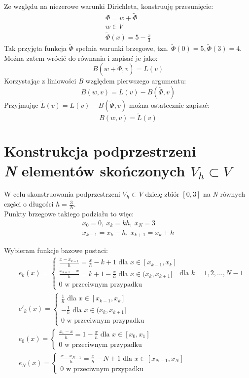 \documentclass{article}
\begin{document}
Ze względu na niezerowe warunki Dirichleta, konstruuję przesunięcie:
\begin{gather*}
    \Phi = w + \tilde{\Phi}\\
    w \in V\\
    \tilde{\Phi}(x) = 5 - \frac{x}{3}
\end{gather*}
Tak przyjęta funkcja \(\tilde{\Phi}\) spełnia warunki brzegowe, tzn. \(\tilde{\Phi}(0) = 5, \tilde{\Phi}(3) = 4\).\\
Można zatem wrócić do równania i zapisać je jako:
\[B(w + \tilde{\Phi}, v) = L(v)\]
Korzystając z liniowości \textit{B} względem pierwszego argumentu:
\[B(w, v) = L(v) - B(\tilde{\Phi}, v)\]
Przyjmując \(\tilde{L}(v) = L(v) - B(\tilde{\Phi}, v)\) można ostatecznie zapisać:
\[B(w, v) = \tilde{L}(v)\]

\section{Konstrukcja podprzestrzeni\\\textit{N} elementów skończonych \(V_h \subset V\)}

W celu skonstruowania podprzestrzeni \(V_h \subset V\) dzielę zbiór \([0, 3]\) na \textit{N} równych części o długości \(h = \frac{3}{N}\).\\
Punkty brzegowe takiego podziału to więc:
\begin{gather*}
    x_0 = 0,\ x_k = kh,\ x_N = 3\\
    x_{k-1} = x_k - h,\ x_{k+1} = x_k + h
\end{gather*}

\noindent
Wybieram funkcje bazowe postaci:
\begin{align*}
    &e_k(x) =
    \begin{cases}
        \frac{x - x_{k-1}}{h} = \frac{x}{h} - k + 1 \text{ dla } x \in [x_{k-1}, x_k]\\
        \frac{x_{k+1} - x}{h} = k + 1 - \frac{x}{h} \text{ dla } x \in (x_k, x_{k+1}]\\
        0 \text{ w przeciwnym przypadku}
    \end{cases} \text{dla } k = 1, 2, \ldots, N-1\\
    &e'_k(x) =
    \begin{cases}
        \frac{1}{h} \text{ dla } x \in [x_{k-1}, x_k]\\
        -\frac{1}{h} \text{ dla } x \in (x_k, x_{k+1}]\\
        0 \text{ w przeciwnym przypadku}
    \end{cases}\\
    &e_0(x) =
    \begin{cases}
        \frac{x_1 - x}{h} = 1 - \frac{x}{h} \text{ dla } x \in [x_0, x_1]\\
        0 \text{ w przeciwnym przypadku}
    \end{cases}\\
    &e_N(x) =
    \begin{cases}
        \frac{x - x_{N-1}}{h} = \frac{x}{h} - N + 1 \text{ dla } x \in [x_{N-1}, x_N]\\
        0 \text{ w przeciwnym przypadku}
    \end{cases}
\end{align*}
\end{document}

